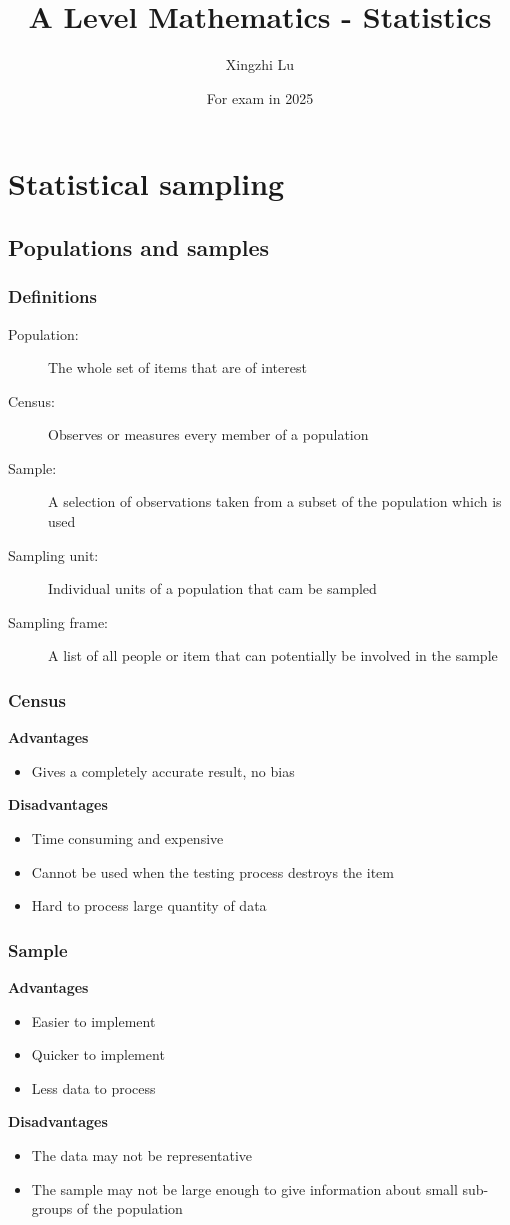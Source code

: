 \documentclass[A4paper, 11pt]{article}
\title{A Level Mathematics - Statistics}
\author{Xingzhi Lu}
\date{For exam in 2025}
\begin{document}
	\maketitle
	\section{Statistical sampling}
	
	\subsection{Populations and samples}
	\subsubsection{Definitions}
	\begin{description}
		\item[Population:] The whole set of items that are of interest
		\item[Census:] Observes or measures every member of a population
		\item[Sample:] A selection of observations taken from a subset of the population which is used
		\item[Sampling unit:] Individual units of a population that cam be sampled
		\item[Sampling frame:] A list of all people or item that can potentially be involved in the sample
	\end{description}
	
	\subsubsection{Census}
	\textbf{Advantages}
	\begin{itemize}
		\item Gives a completely accurate result, no bias
	\end{itemize}
	\textbf{Disadvantages}
	\begin{itemize}
		\item Time consuming and expensive
		\item Cannot be used when the testing process destroys the item
		\item Hard to process large quantity of data
	\end{itemize}
	\subsubsection{Sample}
	\textbf{Advantages}
	\begin{itemize}
		\item Easier to implement
		\item Quicker to implement
		\item Less data to process
	\end{itemize}
	\textbf{Disadvantages}
	\begin{itemize}
		\item The data may not be representative
		\item The sample may not be large enough to give information about small sub-groups of the population
	\end{itemize}
\end{document}
